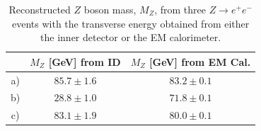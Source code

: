 \documentclass[twoside,        %
               BCOR12mm,       %
               ngerman,english, %
               fleqn,headsepline=false,footsepline=false
              ]{Vorlage/MFPREPORT}
\begin{document}
\begin{table}
\centering
\begin{tabular}{|c|c|c|}
\hline
& $M_Z$ [GeV] from ID&
$M_Z$ [GeV] from EM
Cal.\\
\hline
a)&$85.7\pm
1.6$&$83.2\pm
0.1$\\
\hline
b)&$28.8\pm
1.0$&$71.8\pm
0.1$\\
  \hline
    c)&
    $83.1\pm
    1.9$&$80.0\pm
    0.1$\\
      \hline
        \end{tabular}
          \caption{Reconstructed
          $Z$
          boson
          mass,
          $M_Z$,
          from
          three
          $Z\rightarrow
          e^+e^-$
          events
          with
          the
          transverse
          energy
          obtained
          from
          either
          the
          inner
          detector
          or
          the
          EM
          calorimeter.}
            \label{tab:zres}
        \end{table}
\end{document}
